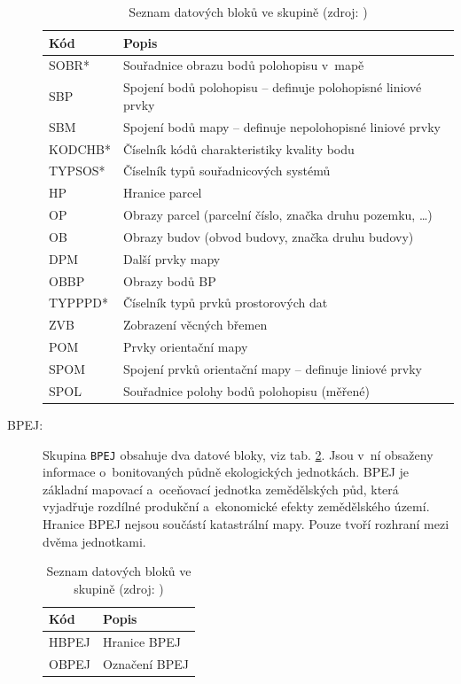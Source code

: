 \documentclass[a4paper,12pt,oneside]{book}
\begin{document}
\begin{description}
\begin{table}[htbp]
\centering
\caption[Seznam datových bloků ve skupině ]{Seznam datových bloků ve skupině  (zdroj: \cite{vfk_struktura})}
\begin{tabular}{ll}
\toprule
\textbf{Kód} & \textbf{Popis} \\ 
\midrule
SOBR* & Souřadnice obrazu bodů polohopisu v~mapě \\ 
SBP & Spojení bodů polohopisu -- definuje polohopisné liniové prvky \\ 
SBM & Spojení bodů mapy -- definuje nepolohopisné liniové prvky \\ 
KODCHB* & Číselník kódů charakteristiky kvality bodu \\ 
TYPSOS* & Číselník typů souřadnicových systémů \\ 
HP & Hranice parcel \\ 
OP & Obrazy parcel (parcelní číslo, značka druhu pozemku, \dots) \\ 
OB & Obrazy budov (obvod budovy, značka druhu budovy) \\ 
DPM & Další prvky mapy \\ 
OBBP & Obrazy bodů BP \\ 
TYPPPD* & Číselník typů prvků prostorových dat \\ 
ZVB & Zobrazení věcných břemen \\ 
POM & Prvky orientační mapy \\ 
SPOM & Spojení prvků orientační mapy -- definuje liniové prvky \\ 
SPOL & Souřadnice polohy bodů polohopisu (měřené) \\  
\bottomrule
\end{tabular}
\label{t_skupina_prvkyKM}
\end{table}
 
 \newpage
 \item[BPEJ:] Skupina \texttt{BPEJ} obsahuje dva datové bloky, viz tab. \ref{t_skupina_bpej}. Jsou v~ní obsaženy informace o~bonitovaných půdně ekologických jednotkách. BPEJ je základní mapovací a~oceňovací jednotka zemědělských půd, která vyjadřuje rozdílné produkční a~ekonomické efekty zemědělského území. Hranice BPEJ nejsou součástí katastrální mapy. Pouze tvoří rozhraní mezi dvěma jednotkami. \cite{dp_landa}

\begin{table}[htbp]
\centering
\caption[Seznam datových bloků ve skupině ]{Seznam datových bloků ve skupině  (zdroj: \cite{vfk_struktura})}
\begin{tabular}{ll}
\toprule
\textbf{Kód} & \textbf{Popis} \\ 
\midrule
HBPEJ & Hranice BPEJ \\ 
OBPEJ & Označení BPEJ \\ 
\bottomrule
\end{tabular}
\label{t_skupina_bpej}
\end{table}
 

\end{description}
\end{document}
